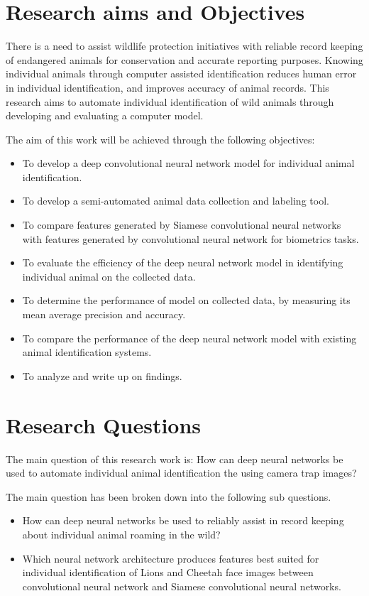 \section{Research  aims  and Objectives}
There is a need to assist wildlife protection initiatives with reliable record keeping of endangered animals for conservation and accurate reporting purposes. Knowing individual animals through computer assisted identification reduces human error in individual identification, and improves accuracy of animal records. This research aims to automate individual identification of wild animals through developing and evaluating a computer model. 

The aim of this work will be achieved through the following objectives: 

\begin{itemize}

    \item To develop a deep convolutional neural network model for individual animal identification.
    \item To develop a semi-automated animal data collection and labeling tool.
    \item To compare features generated by Siamese convolutional neural networks with features generated by convolutional neural network for biometrics tasks.   
    \item To evaluate the efficiency of the deep neural network model in identifying individual animal on the collected data.
    \item To determine the performance of model on collected data, by measuring its mean average precision and accuracy. 
    \item To compare the performance of the deep neural network model with existing animal identification systems. 
    \item To analyze and write up on findings.  
\end{itemize}
\section{Research Questions}
The main question of this research work is: 
How can deep neural networks be used to automate individual animal identification the using camera trap images?

The main question has been broken down into the following sub questions.
\begin{itemize}
    \item How can deep neural networks be used to reliably assist in record keeping about individual animal roaming in the wild?
    \item Which neural network architecture produces features best suited for individual identification of Lions and Cheetah face images between convolutional neural network and Siamese convolutional neural networks.      
\end{itemize}

